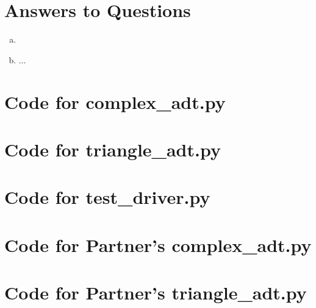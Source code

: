 \documentclass[12pt]{article}
\begin{document}
\section{Answers to Questions}

\begin{enumerate}[(a)]

\item 
\item ...

\end{enumerate}

\newpage

\lstset{language=Python, basicstyle=\tiny, breaklines=true, showspaces=false,
  showstringspaces=false, breakatwhitespace=true}

\def\thesection{\Alph{section}}

\section{Code for complex\_adt.py}

\noindent 

\newpage

\section{Code for triangle\_adt.py}

\noindent 

\newpage

\section{Code for test\_driver.py}

\noindent 

\newpage

\section{Code for Partner's complex\_adt.py}

\noindent 

\section{Code for Partner's triangle\_adt.py}

\noindent 
\end{document}
